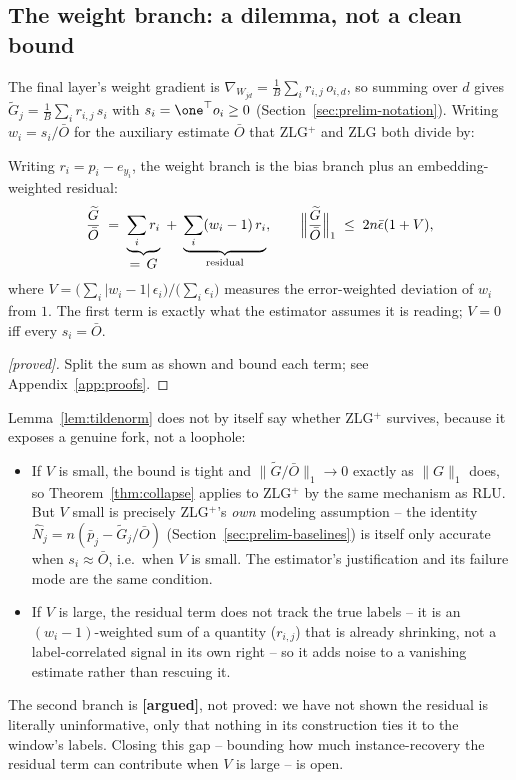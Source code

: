 \subsection{The weight branch: a dilemma, not a clean bound}
\label{sec:method-branch}

The final layer's weight gradient is $\nabla_{W_{jd}} = \tfrac1B\sum_i
r_{i,j}\,o_{i,d}$, so summing over $d$ gives $\widetilde G_j =
\tfrac1B\sum_i r_{i,j}\,s_i$ with $s_i = \one^\top o_i \ge 0$
(Section~\ref{sec:prelim-notation}). Writing $w_i = s_i/\bar O$ for the
auxiliary estimate $\bar O$ that ZLG$^+$ and ZLG both divide by:

\begin{lemma}
\label{lem:tildenorm}
Writing \(r_i = p_i - e_{y_i}\), the weight branch is the bias branch plus
an embedding-weighted residual:
\[
 \frac{\widetilde G}{\bar O} \;=\;
 \underbrace{\sum_i r_{i}}_{\textstyle =\,G}
 \;+\;
 \underbrace{\sum_i (w_i-1)\,r_{i}}_{\text{residual}},
 \qquad
 \Bigl\|\frac{\widetilde G}{\bar O}\Bigr\|_1 \;\le\; 2n\bar\epsilon(1+V),
\]
where \(V = \bigl(\sum_i |w_i-1|\,\epsilon_i\bigr)/\bigl(\sum_i\epsilon_i\bigr)\)
measures the error-weighted deviation of \(w_i\) from \(1\). The first term
is exactly what the estimator assumes it is reading; \(V=0\) iff every
\(s_i = \bar O\).
\end{lemma}

\begin{proof}[\textnormal{[proved]}]
Split the sum as shown and bound each term; see Appendix~\ref{app:proofs}.
\end{proof}

\begin{remark}
\label{rem:dilemma}
Lemma~\ref{lem:tildenorm} does not by itself say whether ZLG$^+$ survives,
because it exposes a genuine fork, not a loophole:
\begin{itemize}
 \item If $V$ is small, the bound is tight and $\|\widetilde G/\bar O\|_1
 \to 0$ exactly as $\|G\|_1$ does, so Theorem~\ref{thm:collapse} applies
 to ZLG$^+$ by the same mechanism as RLU. But $V$ small is precisely
 ZLG$^+$'s \emph{own} modeling assumption -- the identity
 $\widehat N_j = n(\bar p_j - \widetilde G_j/\bar O)$
 (Section~\ref{sec:prelim-baselines}) is itself only accurate when
 $s_i \approx \bar O$, i.e.\ when $V$ is small. The estimator's
 justification and its failure mode are the same condition.
 \item If $V$ is large, the residual term does not track the true labels
 -- it is an $(w_i-1)$-weighted sum of a quantity ($r_{i,j}$) that is
 already shrinking, not a label-correlated signal in its own right -- so
 it adds noise to a vanishing estimate rather than rescuing it.
\end{itemize}
The second branch is \textbf{[argued]}, not proved: we have not shown the
residual is literally uninformative, only that nothing in its
construction ties it to the window's labels. Closing this gap -- bounding
how much instance-recovery the residual term can contribute when $V$ is
large -- is open.
\end{remark}

